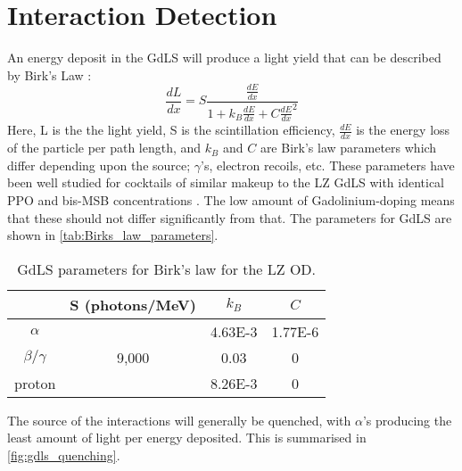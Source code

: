 \section{Interaction Detection}
\label{sec:od_physics}
\par
An energy deposit in the GdLS will produce a light yield that can be described by Birk's Law \cite{birks_law_ref}:
\begin{equation} 
    \frac{dL}{dx} = S \frac{\frac{dE}{dx}}{1 + k_{B}\frac{dE}{dx} + C\frac{dE}{dx}^2}
    \label{eq:birkslaw}
\end{equation}
Here, L is the the light yield, S is the scintillation efficiency, $\frac{dE}{dx}$ is the energy loss of the particle per path length, and $k_{B}$ and $C$ are Birk's law parameters which differ depending upon the source; $\gamma$'s, electron recoils, etc.
These parameters have been well studied for cocktails of similar makeup to the LZ GdLS with identical PPO and bis-MSB concentrations \cite{ls_alpha_quenching_ref,ls_proton_quenching_ref}.
The low amount of Gadolinium-doping means that these should not differ significantly from that.
The parameters for GdLS are shown in \autoref{tab:Birks_law_parameters}.
\begin{table}[!htbp]
    \centering
    \begin{tabular}{c | c | c | c }
                   & S (photons/MeV) & $k_{B}$ & $C$ \\ \hline
    $\alpha$       &                 & 4.63E-3 & 1.77E-6 \\
    $\beta/\gamma$ & 9,000           & 0.03    & 0 \\ 
    proton         &                 & 8.26E-3 & 0
    \end{tabular}
    \caption{GdLS parameters for Birk's law for the LZ OD.}
    \label{tab:Birks_law_parameters}
\end{table} 

\par
The source of the interactions will generally be quenched, with $\alpha$'s producing the least amount of light per energy deposited.
This is summarised in \autoref{fig:gdls_quenching}.




